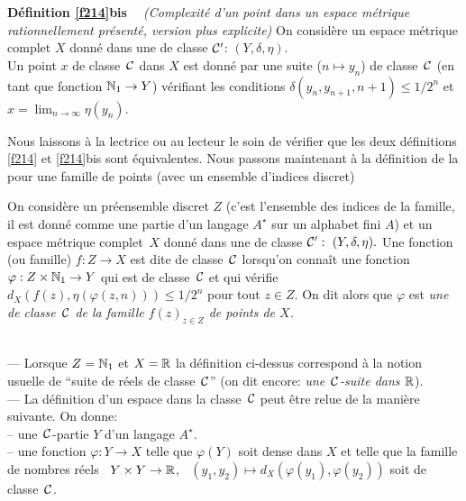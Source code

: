 \mni
{\bf Définition \ref{f214}bis  ~}
{\em (Complexité d'un point dans un espace métrique 
rationnellement présenté, version plus explicite)} 
On considère un espace métrique complet  $X$  donné dans  une \pres de 
classe  ${{\cal C}}'$: $(Y, \delta,\eta)$. \\
Un point  $x$  de classe~${{\cal C}}$   dans  $X$  est donné par une suite  ($n 
\mapsto y_n$)  de classe~${{\cal C}}$   
(en tant que fonction   $\mathbb {N}_1   \rightarrow   Y$)   
vérifiant les conditions
$\delta(y_n,y_{n+1},n+1) \leq 1/2^n$ 
et $x=\lim_{n\rightarrow \infty}\eta(y_n)$.


\medskip 
Nous laissons à la lectrice ou au lecteur le soin de vérifier que les deux 
définitions \ref{f214} et \ref{f214}bis sont équivalentes.
Nous passons maintenant à la définition de la \com pour une famille de 
points (avec un ensemble d'indices discret)

\begin{fdefinition} \label{f217} 
On considère un préensemble discret  $Z$  (c'est l'ensemble des indices de 
la famille, il est donné comme une partie d'un langage  $A^{\star}$  sur un alphabet fini  $A$)  et un espace métrique complet~$X$  donné dans  une \pres de classe ${{\cal C}}':~(Y, \delta,\eta).$  Une fonction (ou famille)   
$f\colon  Z \rightarrow X$  est dite de classe~${{\cal C}}$  lorsqu'on connaît une fonction $\varphi : Z \times \mathbb {N}_1 \rightarrow Y$ qui est de classe~${{\cal C}}$   et qui vérifie 
$d_X(f(z),\eta(\varphi(z,n))) \leq 1/2^n$  pour tout $z \in Z$. 
On dit alors que  $\varphi$  est {\em une \pres de classe~${{\cal C}}$  de la famille $f(z)_{z\in Z}$ de points de  $X$.}
\end{fdefinition}

\begin{fexamples} \label{f218}~\\
--- Lorsque  $Z = \mathbb {N}_1$  et  $X = \mathbb {R}$  la définition ci-dessus correspond 
à la notion usuelle de ``suite de réels de classe~${{\cal C}}$'' (on dit encore: 
{\em une~${{\cal C}}$-suite dans  $\mathbb {R}$}). \\
--- La définition d'un espace \rapr dans la classe~${{\cal C}}$  peut être relue de 
la manière suivante. On donne: \\
\spa -- une~${{\cal C}}$-partie  $Y$  d'un langage  $A^{\star}$. \\
\spa -- une fonction $\varphi \colon  Y \rightarrow X$ telle que $\varphi(Y)$ soit 
dense dans  $X$  et telle que la famille de nombres réels  $\; \; Y \times Y
\rightarrow \mathbb {R}$, $\; \; (y_1, y_2) \mapsto  d_X(\varphi(y_1), \varphi(y_2))$ 
soit de classe~${{\cal C}}$. 
\end{fexamples}
 
